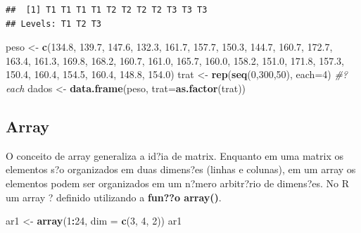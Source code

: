 \documentclass[]{book}
\newenvironment{Shaded}{\begin{snugshade}}{\end{snugshade}}
\newcommand{\CommentTok}[1]{\textcolor[rgb]{0.56,0.35,0.01}{\textit{#1}}}
\newcommand{\DataTypeTok}[1]{\textcolor[rgb]{0.13,0.29,0.53}{#1}}
\newcommand{\DecValTok}[1]{\textcolor[rgb]{0.00,0.00,0.81}{#1}}
\newcommand{\FloatTok}[1]{\textcolor[rgb]{0.00,0.00,0.81}{#1}}
\newcommand{\KeywordTok}[1]{\textcolor[rgb]{0.13,0.29,0.53}{\textbf{#1}}}
\newcommand{\NormalTok}[1]{#1}
\newcommand{\OperatorTok}[1]{\textcolor[rgb]{0.81,0.36,0.00}{\textbf{#1}}}
\newcommand{\StringTok}[1]{\textcolor[rgb]{0.31,0.60,0.02}{#1}}
\begin{document}
\begin{verbatim}
##  [1] T1 T1 T1 T1 T2 T2 T2 T2 T3 T3 T3
## Levels: T1 T2 T3
\end{verbatim}

\begin{Shaded}
\begin{Highlighting}[]
\NormalTok{peso  <-}\StringTok{ }\KeywordTok{c}\NormalTok{(}\FloatTok{134.8}\NormalTok{, }\FloatTok{139.7}\NormalTok{, }\FloatTok{147.6}\NormalTok{, }\FloatTok{132.3}\NormalTok{, }\FloatTok{161.7}\NormalTok{, }\FloatTok{157.7}\NormalTok{, }\FloatTok{150.3}\NormalTok{, }\FloatTok{144.7}\NormalTok{,}
           \FloatTok{160.7}\NormalTok{, }\FloatTok{172.7}\NormalTok{, }\FloatTok{163.4}\NormalTok{, }\FloatTok{161.3}\NormalTok{, }\FloatTok{169.8}\NormalTok{, }\FloatTok{168.2}\NormalTok{, }\FloatTok{160.7}\NormalTok{, }\FloatTok{161.0}\NormalTok{,}
           \FloatTok{165.7}\NormalTok{, }\FloatTok{160.0}\NormalTok{, }\FloatTok{158.2}\NormalTok{, }\FloatTok{151.0}\NormalTok{, }\FloatTok{171.8}\NormalTok{, }\FloatTok{157.3}\NormalTok{, }\FloatTok{150.4}\NormalTok{, }\FloatTok{160.4}\NormalTok{,}
           \FloatTok{154.5}\NormalTok{, }\FloatTok{160.4}\NormalTok{, }\FloatTok{148.8}\NormalTok{, }\FloatTok{154.0}\NormalTok{)}
\NormalTok{trat  <-}\StringTok{ }\KeywordTok{rep}\NormalTok{(}\KeywordTok{seq}\NormalTok{(}\DecValTok{0}\NormalTok{,}\DecValTok{300}\NormalTok{,}\DecValTok{50}\NormalTok{), }\DataTypeTok{each=}\DecValTok{4}\NormalTok{)  }\CommentTok{#?each}
\NormalTok{dados <-}\StringTok{  }\KeywordTok{data.frame}\NormalTok{(peso, }\DataTypeTok{trat=}\KeywordTok{as.factor}\NormalTok{(trat))}
\end{Highlighting}
\end{Shaded}

\hypertarget{array}{%
\subsection{Array}\label{array}}

O conceito de array generaliza a id?ia de matrix. Enquanto em uma matrix os elementos s?o organizados em duas dimens?es (linhas e colunas), em um array os elementos podem ser organizados em um n?mero arbitr?rio de dimens?es.
No R um array ? definido utilizando a \textbf{fun??o array()}.

\begin{Shaded}
\begin{Highlighting}[]
\NormalTok{ar1 <-}\StringTok{ }\KeywordTok{array}\NormalTok{(}\DecValTok{1}\OperatorTok{:}\DecValTok{24}\NormalTok{, }\DataTypeTok{dim =} \KeywordTok{c}\NormalTok{(}\DecValTok{3}\NormalTok{, }\DecValTok{4}\NormalTok{, }\DecValTok{2}\NormalTok{)) }
\NormalTok{ar1}
\end{Highlighting}
\end{Shaded}
\end{document}
